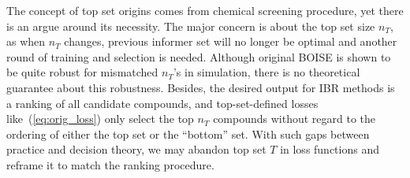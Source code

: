 \documentclass[11pt,a4paper]{article}
\theoremstyle{plain}
\begin{document}
The concept of top set origins comes from chemical screening procedure, yet there is an argue around its necessity. 
The major concern is about the top set size $n_T$, as when $n_T$ changes, previous informer set will no longer be optimal %
and another round of training and selection is needed. 
Although original BOISE is shown to be quite robust for mismatched $n_T$'s in simulation, there is no theoretical guarantee about this robustness. 
Besides, the desired output for IBR methods is a ranking of all candidate compounds, and top-set-defined losses like~(\ref{eq:orig_loss}) 
only select the top $n_T$ compounds without regard to the ordering of either the top set or the ``bottom'' set.
With such gaps between practice and decision theory, we may abandon top set $T$ in loss functions and reframe it to match the ranking procedure.

\end{document}

